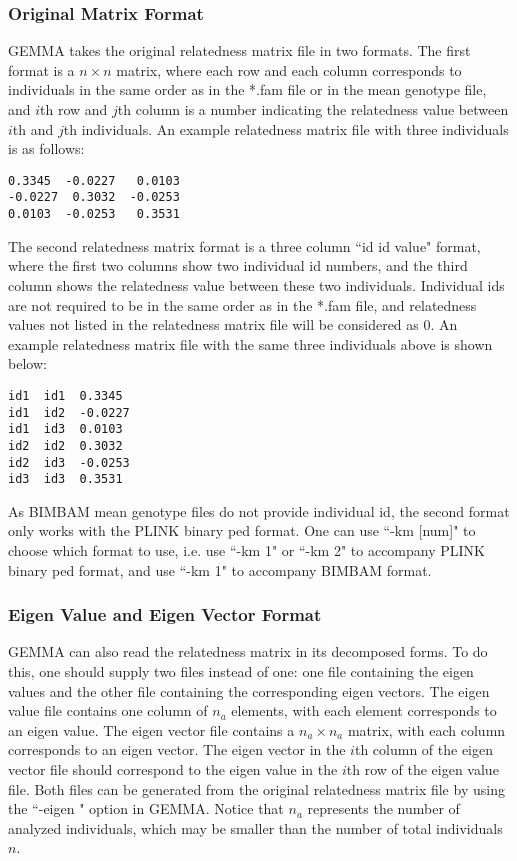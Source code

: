 \documentclass[11pt]{article}
\begin{document}
\subsubsection{Original Matrix Format}
GEMMA takes the original relatedness matrix file in two formats. The first format is a $n\times n$ matrix, where each row and each column corresponds to individuals in the same order as in the *.fam file or in the mean genotype file, and $i$th row and $j$th column is a number indicating the relatedness value between $i$th and $j$th individuals. An example relatedness matrix file with three individuals is as follows:
%
\begin{verbatim}
0.3345  -0.0227   0.0103
-0.0227  0.3032  -0.0253
0.0103  -0.0253   0.3531
\end{verbatim}
%
The second relatedness matrix format is a three column ``id id value" format, where the first two columns show two individual id numbers, and the third column shows the relatedness value between these two individuals. Individual ids are not required to be in the same order as in the *.fam file, and relatedness values not listed in the relatedness matrix file will be considered as 0. An example relatedness matrix file with the same three individuals above is shown below:
%
\begin{verbatim}
id1  id1  0.3345
id1  id2  -0.0227
id1  id3  0.0103
id2  id2  0.3032
id2  id3  -0.0253
id3  id3  0.3531
\end{verbatim}
%
As BIMBAM mean genotype files do not provide individual id, the second format only works with the PLINK binary ped format. One can use ``-km [num]" to choose which format to use, i.e. use ``-km 1" or  ``-km 2" to accompany PLINK binary ped format, and use ``-km 1" to accompany BIMBAM format.

\subsubsection{Eigen Value and Eigen Vector Format}
GEMMA can also read the relatedness matrix in its decomposed forms. To do this, one should supply two files instead of one: one file containing the eigen values and the other file containing the corresponding eigen vectors. The eigen value file contains one column of $n_{a}$ elements, with each element corresponds to an eigen value. The eigen vector file contains a $n_a\times n_a$ matrix, with each column corresponds to an eigen vector. The eigen vector in the $i$th column of the eigen vector file should correspond to the eigen value in the $i$th row of the eigen value file. Both files can be generated from the original relatedness matrix file by using the ``-eigen " option in GEMMA. Notice that $n_a$ represents the number of analyzed individuals, which may be smaller than the number of total individuals $n$. 
\end{document}
